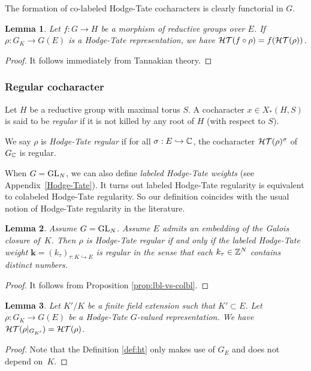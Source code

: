 \documentclass[10pt,a4paper,twoside]{article}
\newtheorem{lem}{Lemma}
\begin{document}
The formation of co-labeled Hodge-Tate cocharacters is clearly functorial in $G$.

\begin{lem}
\label{lem:ht-functorial}
Let $f:G\to H$ be a morphism of reductive groups over $E$.
If $\rho:G_K \to G(E)$ is a Hodge-Tate representation,
we have ${\mathcal{HT}}(f\circ \rho) = f({\mathcal{HT}}(\rho))$.
\end{lem}

\begin{proof}
It follows immediately from Tannakian theory.
\end{proof}


\subsubsection{Regular cocharacter}
\label{HT-regular}
Let $H$ be a reductive group with maximal torus $S$.
A cocharacter $x\in X_{*}(H,S)$ is said to be \textit{regular}
if it is not killed by any root of $H$ (with respect to $S$).

We say $\rho$ is \textit{Hodge-Tate regular}
if for all $\sigma:E\hookrightarrow {\mathbb{C}}$,
the cocharacter ${\mathcal{HT}}(\rho)^{\sigma}$ of $G_{{\mathbb{C}}}$ is regular.

When $G=\operatorname{GL}_N$, we can also define \textit{labeled Hodge-Tate weights} (see Appendix~\ref{Hodge-Tate}).
It turns out labeled Hodge-Tate regularity is equivalent to colabeled Hodge-Tate regularity.
So our definition coincides with the usual notion of Hodge-Tate regularity
in the literature.

\begin{lem}
Assume $G = \operatorname{GL}_N$.
Assume $E$ admits an embedding of the Galois closure of~$K$.
Then $\rho$ is Hodge-Tate regular if and only if 
the \textit{labeled Hodge-Tate weight}
$\mathbf{k} = (k_\tau)_{\tau:K \hookrightarrow E}$
is regular in the sense that each $k_\tau\in {\mathbb{Z}}^N$ contains distinct numbers.
\end{lem}

\begin{proof}
It follows from Proposition \ref{prop:lbl-vs-colbl}.
\end{proof}


\begin{lem}
Let $K'/K$ be a finite field extension
such that $K'\subset E$.
Let $\rho:G_K \to G(E)$ be a Hodge-Tate $G$-valued representation.
We have 
${\mathcal{HT}}(\rho|_{G_{K'}}) = {\mathcal{HT}}(\rho)$.
\end{lem}

\begin{proof}
Note that the Definition \ref{def:ht}
only makes use of $G_E$ and does not depend on~$K$.
\end{proof}
\end{document}
